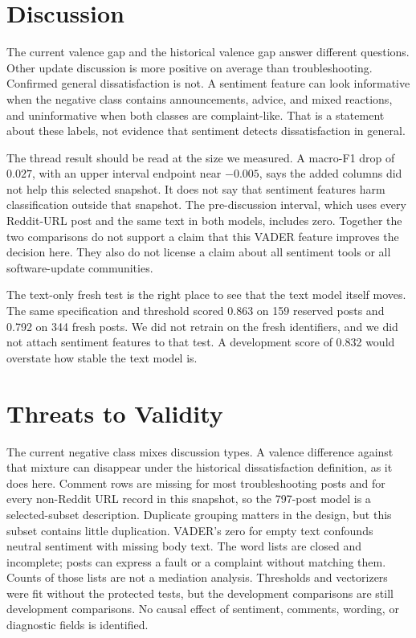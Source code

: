 \documentclass[conference,letterpaper]{IEEEtran}
\begin{document}
\section{Discussion}
The current valence gap and the historical valence gap answer different questions. Other update discussion is more positive on average than troubleshooting. Confirmed general dissatisfaction is not. A sentiment feature can look informative when the negative class contains announcements, advice, and mixed reactions, and uninformative when both classes are complaint-like. That is a statement about these labels, not evidence that sentiment detects dissatisfaction in general.

The thread result should be read at the size we measured. A macro-F1 drop of $0.027$, with an upper interval endpoint near $-0.005$, says the added columns did not help this selected snapshot. It does not say that sentiment features harm classification outside that snapshot. The pre-discussion interval, which uses every Reddit-URL post and the same text in both models, includes zero. Together the two comparisons do not support a claim that this VADER feature improves the decision here. They also do not license a claim about all sentiment tools or all software-update communities.

The text-only fresh test is the right place to see that the text model itself moves. The same specification and threshold scored 0.863 on 159 reserved posts and 0.792 on 344 fresh posts. We did not retrain on the fresh identifiers, and we did not attach sentiment features to that test. A development score of 0.832 would overstate how stable the text model is.

\section{Threats to Validity}
The current negative class mixes discussion types. A valence difference against that mixture can disappear under the historical dissatisfaction definition, as it does here. Comment rows are missing for most troubleshooting posts and for every non-Reddit URL record in this snapshot, so the 797-post model is a selected-subset description. Duplicate grouping matters in the design, but this subset contains little duplication. VADER's zero for empty text confounds neutral sentiment with missing body text. The word lists are closed and incomplete; posts can express a fault or a complaint without matching them. Counts of those lists are not a mediation analysis. Thresholds and vectorizers were fit without the protected tests, but the development comparisons are still development comparisons. No causal effect of sentiment, comments, wording, or diagnostic fields is identified.
\end{document}
